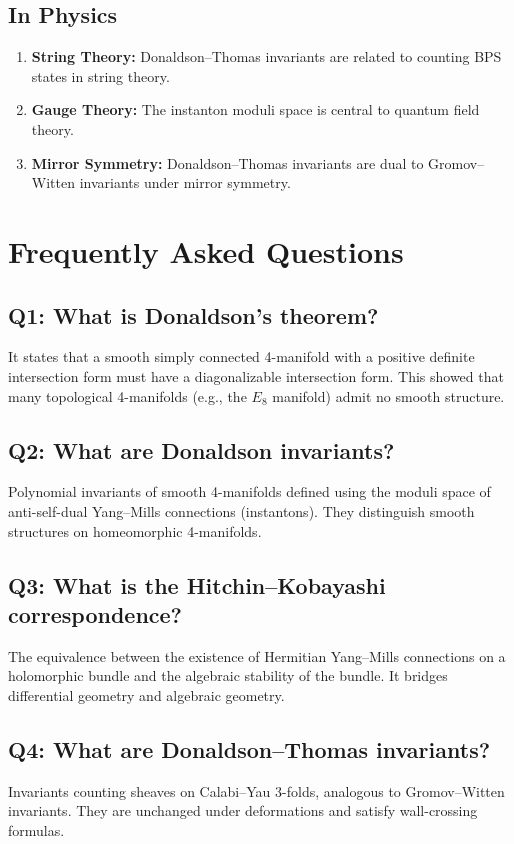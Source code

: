\subsection{In Physics}

\begin{enumerate}
    \item \textbf{String Theory:} Donaldson--Thomas invariants are related to counting BPS states in string theory.
    \item \textbf{Gauge Theory:} The instanton moduli space is central to quantum field theory.
    \item \textbf{Mirror Symmetry:} Donaldson--Thomas invariants are dual to Gromov--Witten invariants under mirror symmetry.
\end{enumerate}

\section{Frequently Asked Questions}

\subsection*{Q1: What is Donaldson's theorem?}
It states that a smooth simply connected 4-manifold with a positive definite intersection form must have a diagonalizable intersection form. This showed that many topological 4-manifolds (e.g., the $E_8$ manifold) admit no smooth structure.

\subsection*{Q2: What are Donaldson invariants?}
Polynomial invariants of smooth 4-manifolds defined using the moduli space of anti-self-dual Yang--Mills connections (instantons). They distinguish smooth structures on homeomorphic 4-manifolds.

\subsection*{Q3: What is the Hitchin--Kobayashi correspondence?}
The equivalence between the existence of Hermitian Yang--Mills connections on a holomorphic bundle and the algebraic stability of the bundle. It bridges differential geometry and algebraic geometry.

\subsection*{Q4: What are Donaldson--Thomas invariants?}
Invariants counting sheaves on Calabi--Yau 3-folds, analogous to Gromov--Witten invariants. They are unchanged under deformations and satisfy wall-crossing formulas.

